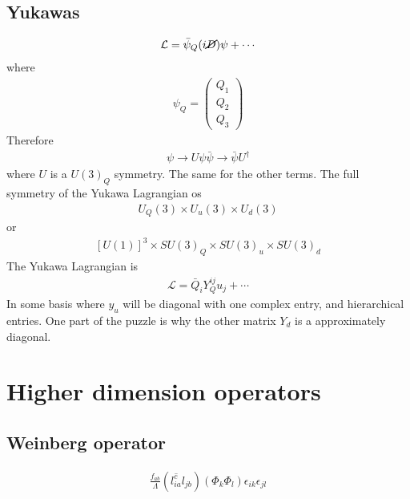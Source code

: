 \documentclass[12pt,letterpaper]{article}
\begin{document}
\subsection{Yukawas}
\begin{align*}
  \mathcal{L}=\bar{\psi}_{Q}(i\cancel{D})\psi+\cdots
\end{align*}
where
\begin{align*}
  \psi_Q=
\begin{pmatrix}
Q_1\\
Q_2\\
Q_3
\end{pmatrix}
\end{align*}
Therefore
\begin{align*}
  \psi\to U\psi
\bar{\psi}\to \bar{\psi} U^\dagger
\end{align*}
where $U$ is a $U(3)_Q$ symmetry. The same for the other terms. The full symmetry of the Yukawa Lagrangian os
\begin{align*}
  U_Q(3)\times U_u(3)\times U_d(3)
\end{align*}
or
\begin{align*}
  \left[ U(1) \right]^3\times SU(3)_Q\times SU(3)_u\times SU(3)_d
\end{align*}
The Yukawa Lagrangian is
\begin{align*}
  \mathcal{L}=\bar{Q}_i Y_Q^{ij} u_j+\cdots
\end{align*}
In some basis where $y_u$ will be diagonal with one complex entry, and
hierarchical entries. One part of the puzzle is why the other matrix
$Y_d$ is a approximately diagonal.

\section{Higher dimension operators}
\subsection{Weinberg operator}
\begin{align}
  \frac{f_{ab}}{\Lambda}\left( \overline{l^c_{ia}}l_{jb} \right)\left( \Phi_k\Phi_l \right)\epsilon_{ik}\epsilon_{jl}
\end{align}
\end{document}
